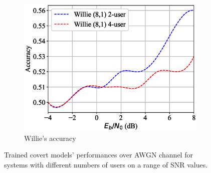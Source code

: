 \begin{figure}[tp!]
\begin{subfigure}{0.32\textwidth}
		\includegraphics[width=\linewidth]{figs/multi_willie_accuracy_awgn}
		\caption{Willie's accuracy}	
		\label{fig:multi_awgn_results_willie}
	\end{subfigure}
	\caption{Trained covert models' performances over AWGN channel for systems with different numbers of users on a range of SNR values.}
	\label{fig:multi_awgn_results}
\end{figure}
